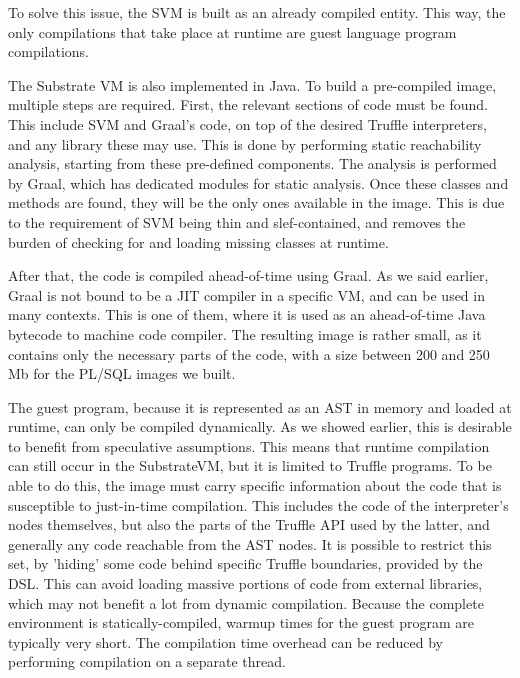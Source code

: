 \documentclass[twoside,11pt,a4paper]{article}
\begin{document}
To solve this issue, the SVM is built as an already compiled entity. This way, the only compilations that take place at runtime are guest language program compilations.

The Substrate VM is also implemented in Java. To build a pre-compiled image, multiple steps are required. First, the relevant sections of code must be found. This include SVM and Graal's code, on top of the desired Truffle interpreters, and any library these may use. This is done by performing static reachability analysis, starting from these pre-defined components. The analysis is performed by Graal, which has dedicated modules for static analysis. Once these classes and methods are found, they will be the only ones available in the image. This is due to the requirement of SVM being thin and slef-contained, and removes the burden of checking for and loading missing classes at runtime.

After that, the code is compiled ahead-of-time using Graal. As we said earlier, Graal is not bound to be a JIT compiler in a specific VM, and can be used in many contexts. This is one of them, where it is used as an ahead-of-time Java bytecode to machine code compiler. The resulting image is rather small, as it contains only the necessary parts of the code, with a size between 200 and 250 Mb for the PL/SQL images we built.



The guest program, because it is represented as an AST in memory and loaded at runtime, can only be compiled dynamically. As we showed earlier, this is desirable to benefit from speculative assumptions. This means that runtime compilation can still occur in the SubstrateVM, but it is limited to Truffle programs. To be able to do this, the image must carry specific information about the code that is susceptible to just-in-time compilation. This includes the code of the interpreter's nodes themselves, but also the parts of the Truffle API used by the latter, and generally any code reachable from the AST nodes. It is possible to restrict this set, by 'hiding' some code behind specific Truffle boundaries, provided by the DSL. This can avoid loading massive portions of code from external libraries, which may not benefit a lot from dynamic compilation. Because the complete environment is statically-compiled, warmup times for the guest program are typically very short. The compilation time overhead can be reduced by performing compilation on a separate thread.
\end{document}
